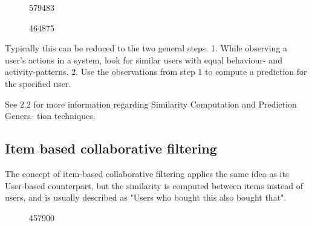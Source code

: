 \begin{figure}[H]
    {\par}
    \caption{579483}
\end{figure}


\lipsum[1]


\begin{figure}[H]
    {\par}
    \caption{464875}
\end{figure}

Typically this can be reduced to the two general steps. 
1. While observing a user’s actions in a system, look for similar users with equal behaviour- and activity-patterns. 
2. Use the observations from step 1 to compute a prediction for the specified user. 

See 2.2 for more information regarding Similarity Computation and Prediction Genera- tion techniques.

\subsection{Item based collaborative filtering}
The concept of item-based collaborative filtering applies the same idea as its User-based counterpart, but the similarity is computed between items instead of users, and is usually described as "Users who bought this also bought that". 

\begin{figure}[H]
    {\par}
    \caption{457900}
\end{figure}

\lipsum[2]


